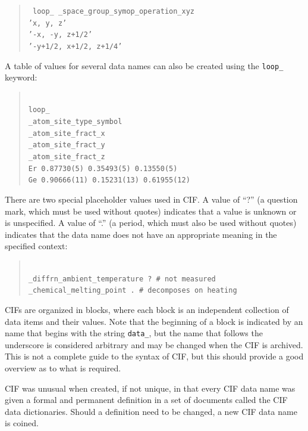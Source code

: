 \begin{quote}
\texttt{
loop\_ \_space\_group\_symop\_operation\_xyz \\
   'x, y, z'\\
   '-x, -y, z+1/2'\\
   '-y+1/2, x+1/2, z+1/4'\\
}    
\end{quote}
A table of values for several data names can also be created using the \texttt{loop\_}
keyword:

\begin{quote}
\texttt{\\
loop\_\\
   \_atom\_site\_type\_symbol\\
   \_atom\_site\_fract\_x\\
   \_atom\_site\_fract\_y\\
   \_atom\_site\_fract\_z\\
   Er        0.87730(5)    0.35493(5)    0.13550(5)\\
   Ge       0.90666(11)   0.15231(13)   0.61955(12)\\
}
\end{quote}

There are two special placeholder values used in CIF. A value of ``?'' (a question mark, which must be used without quotes) indicates that a value is unknown or is unspecified. 
A value of ``.'' (a period, which must also be used without quotes) indicates that the data name
does not have an appropriate meaning in the specified context:

\begin{quote}
\texttt{\\
\_diffrn\_ambient\_temperature     ?  \# not measured\\
\_chemical\_melting\_point            .  \# decomposes on heating\\
}
\end{quote}

CIFs are organized in blocks, where each block is an independent collection of data items and their values. 
Note that the beginning of a block is indicated by an name that begins with the string \texttt{data\_}, but the name that follows the underscore is considered arbitrary and may be changed when the CIF is archived. This is not a complete guide to the syntax of CIF, but this should provide a good overview as to what is required. 

CIF was unusual when created, if not unique, in that every CIF data name was given a formal and permanent definition in a set of documents called the CIF data dictionaries. Should a definition need to be changed, a new CIF data name is coined. 

